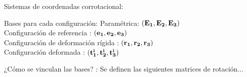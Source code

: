 \documentclass[
  aspectratio=169,
]{beamer}
\begin{document}
\begin{small}
\begin{frame}{Sistemas de coordenadas corrotacional:}{}
\begin{minipage}[t]{0.5\linewidth}
\begin{block}{Bases para cada configuración:}
		 Paramétrica: $(\bf{E_1},\bf{E_2},\bf{E_3})$\\
		{\color{blue}Configuración de referencia} : $(\bf{e_1},\bf{e_2},\bf{e_3})$\\
		{\color{gray}Configuración de deformación rígida} : $(\bf{r_1},\bf{r_2},\bf{r_3})$\\
		{\color{orange}Configuración deformada} :  $(\bf{t_1^i},\bf{t_2^i},\bf{t_3^i})$\\
\end{block}
\begin{block}{¿Cómo se vinculan las bases? :}
	Se definen las siguientes matrices de rotación...
\end{block}
	\end{minipage}	
\end{frame}


\end{small}
\end{document}

